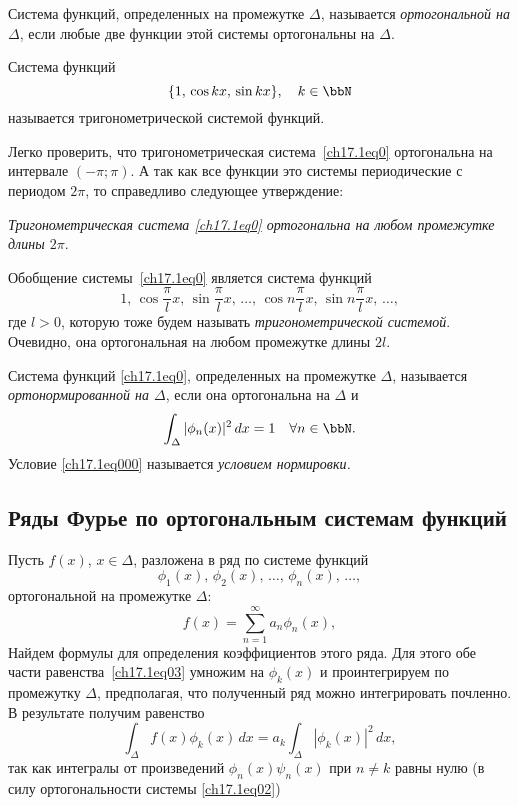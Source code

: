 \begin{defn}
Система функций, определенных на промежутке $\Delta$, называется \textit{ортогональной на $\Delta$}, если любые две функции этой системы ортогональны на $\Delta$.
\end{defn}

\begin{defn}
Система функций 
\begin{equation} \label{ch17.1eq0}
\{1,\,\cos kx,\,\sin kx\}, \quad k\in \bbN
\end{equation}
называется тригонометрической системой функций.			
\end{defn}
Легко проверить, что тригонометрическая система~\eqref{ch17.1eq0} ортогональна на интервале $(-\pi;\pi)$. А так как все функции это системы периодические с периодом $2\pi$, то справедливо следующее утверждение:

\textit{Тригонометрическая система \eqref{ch17.1eq0} ортогональна на любом промежутке длины $2\pi$}.	

Обобщение системы~\eqref{ch17.1eq0} является система функций
$$
1,\,\cos \frac{\pi}{l}x,\,\sin \frac{\pi}{l}x,\,\ldots,\,\cos n\frac{\pi}{l}x,\,\sin n\frac{\pi}{l}x,\,\ldots,
$$
где $l>0$, которую тоже будем называть \textit{тригонометрической системой}. Очевидно, она ортогональная на любом промежутке длины $2l$.
\begin{defn}
Система функций \eqref{ch17.1eq0}, определенных на промежутке $\Delta$, называется \textit{ортонормированной на $\Delta$}, если она ортогональна на $\Delta$ и 
\begin{equation} \label{ch17.1eq000}
\int _\Delta{|\phi_n(x)|^2\,dx=1} \quad \forall n \in \bbN.
\end{equation}
Условие \eqref{ch17.1eq000} называется \textit{условием нормировки.}
\end{defn}

\subsection{Ряды Фурье по ортогональным системам функций}

Пусть $f(x)$, $x \in \Delta$, разложена в ряд по системе функций
\begin{equation} \label{ch17.1eq02}
\phi_1(x),\,\phi_2(x),\,\ldots,\,\phi_n(x),\,\ldots,
\end{equation}
ортогональной на промежутке $\Delta$:
\begin{equation} \label{ch17.1eq03}
f(x)= \sum_{n = 1}^{\infty} a_n \phi_n(x),
\end{equation}
Найдем формулы для определения коэффициентов этого ряда. Для этого обе части равенства~\eqref{ch17.1eq03} умножим на $\phi_k(x)$ и проинтегрируем по промежутку $\Delta$, предполагая, что полученный ряд можно интегрировать почленно. В результате получим равенство
$$
\int_\Delta{f(x) \phi_k(x)}\,dx=a_k\int_\Delta|\phi_k(x)|^2\,dx,
$$
так как интегралы от произведений $\phi_n(x)\psi_n(x)$ при $n\ne k$ равны нулю (в силу ортогональности системы \eqref{ch17.1eq02})

